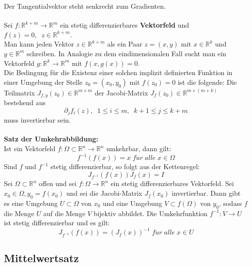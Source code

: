 \documentclass[a4paper,twocolumn,10pt]{article}
\begin{document}
Der Tangentialvektor steht senkrecht zum Gradienten.\\\\
Sei $f:\mathbb{R}^{k+m}\rightarrow\mathbb{R}^m$ ein stetig differenzierbares \textbf{Vektorfeld} und $f(z)=0,\;\;z\in\mathbb{R}^{k+m}$.\\
Man kann jeden Vektor $z\in\mathbb{R}^{k+m}$ als ein Paar $z=(x,y)$ mit $x\in\mathbb{R}^k$ und $y\in\mathbb{R}^m$ schreiben. In Analogie zu dem eindimensionalen Fall sucht man ein Vektorfeld $g:\mathbb{R}^k\rightarrow\mathbb{R}^m$ mit $f(x,g(x))=0$.\\
Die Bedingung für die Existenz einer solchen implizit definierten Funktion in einer Umgebung der Stelle $z_0=(x_0,y_0)$ mit $f(z_0)=0$ ist die folgende: Die Teilmatrix $J_{f,y}(z_0)\in\mathbb{R}^{m\times m}$ der Jacobi-Matrix $J_f(z_0)\in\mathbb{R}^{m\times (m+k)}$ bestehend aus
\begin{equation*}
\partial_j f_i(z),\;\;1\leq i\leq m,\;\;k+1\leq j\leq k+m
\end{equation*}
muss invertierbar sein.\\\\
\textbf{Satz der Umkehrabbildung:}\\
Ist ein Vektorfeld $f:\Omega\subset\mathbb{R}^n\rightarrow\mathbb{R}^n$ umkehrbar, dann gilt:
\begin{equation*}
f^{-1}(f(x))=x\;f\ddot{u}r\;alle\;x\in\Omega
\end{equation*}
Sind $f$ und $f^{-1}$ stetig differenzierbar, so folgt aus der Kettenregel:
\begin{equation*}
J_{f^{-1}}(f(x))J_f(x)=I
\end{equation*}
Sei $\Omega\subset\mathbb{R}^n$ offen und sei $f:\Omega\rightarrow\mathbb{R}^n$ ein stetig differenzierbares Vektorfeld. Sei $x_0\in\Omega, y_0=f(x_0)$ und sei die Jacobi-Matrix $J_f(x_0)$ invertierbar. Dann gibt es eine Umgebung $U\subset \Omega$ von $x_0$ und eine Umgebung $V\subset f(\Omega)$ von $y_0$, sodass $f$ die Menge $U$ auf die Menge $V$ bijektiv abbildet. Die Umkehrfunktion $f^{-1}:V\rightarrow U$ ist stetig differenzierbar und es gilt:
\begin{equation*}
J_{f^{-1}}(f(x))=(J_f(x))^{-1}\;f\ddot{u}r\;alle\;x\in U
\end{equation*}

\subsection{Mittelwertsatz}
\end{document}
